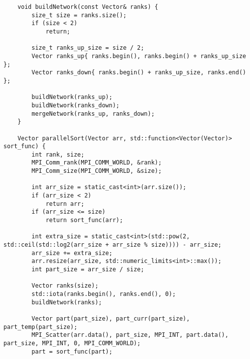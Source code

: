 \documentclass{report}
\begin{document}
\begin{lstlisting}
    void buildNetwork(const Vector& ranks) {
        size_t size = ranks.size();
        if (size < 2)
            return;

        size_t ranks_up_size = size / 2;
        Vector ranks_up{ ranks.begin(), ranks.begin() + ranks_up_size };
        Vector ranks_down{ ranks.begin() + ranks_up_size, ranks.end() };

        buildNetwork(ranks_up);
        buildNetwork(ranks_down);
        mergeNetwork(ranks_up, ranks_down);
    }

    Vector parallelSort(Vector arr, std::function<Vector(Vector)> sort_func) {
        int rank, size;
        MPI_Comm_rank(MPI_COMM_WORLD, &rank);
        MPI_Comm_size(MPI_COMM_WORLD, &size);

        int arr_size = static_cast<int>(arr.size());
        if (arr_size < 2)
            return arr;
        if (arr_size <= size)
            return sort_func(arr);

        int extra_size = static_cast<int>(std::pow(2, std::ceil(std::log2(arr_size + arr_size % size)))) - arr_size;
        arr_size += extra_size;
        arr.resize(arr_size, std::numeric_limits<int>::max());
        int part_size = arr_size / size;

        Vector ranks(size);
        std::iota(ranks.begin(), ranks.end(), 0);
        buildNetwork(ranks);

        Vector part(part_size), part_curr(part_size), part_temp(part_size);
        MPI_Scatter(arr.data(), part_size, MPI_INT, part.data(), part_size, MPI_INT, 0, MPI_COMM_WORLD);
        part = sort_func(part);


\end{lstlisting}
\end{document}
